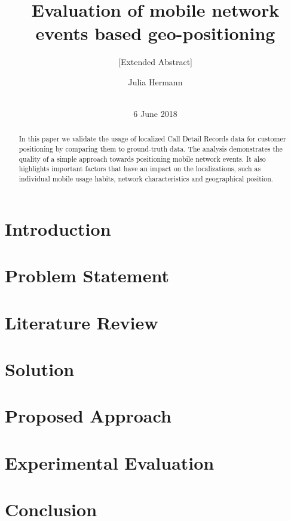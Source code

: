 \documentclass{sig-alternate-05-2015}
\begin{document}
\title{Evaluation of mobile network events based geo-positioning}
\subtitle{[Extended Abstract]}

\author{
\alignauthor
Julia Hermann\\
       \\
}

\maketitle
\date{6 June 2018}
\begin{abstract}
In this paper we validate the usage of localized Call Detail Records data for customer positioning by comparing them to ground-truth data. The analysis demonstrates the quality of a simple approach towards positioning mobile network events. It also highlights important factors that have an impact on the localizations, such as individual mobile usage habits, network characteristics and geographical position.

\end{abstract}
\section{Introduction}
\section{Problem Statement}
\section{Literature Review}
\section{Solution}
\section{Proposed Approach}
\section{Experimental Evaluation}
\section{Conclusion}



\end{document}
